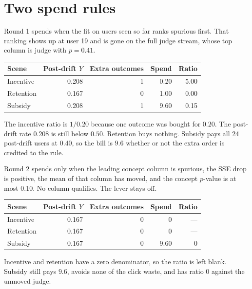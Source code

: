 \documentclass[11pt,a4paper]{article}
\begin{document}
\section{Two spend rules}
Round 1 spends when the fit on users seen so far ranks spurious first. That ranking shows up at user 19 and is gone on the full judge stream, whose top column is judge with \(p=0.41\).

\begin{center}
\begin{tabular}{lrrrr}
\toprule
Scene & Post-drift \(Y\) & Extra outcomes & Spend & Ratio \\
\midrule
Incentive & 0.208 & 1 & 0.20 & 5.00 \\
Retention & 0.167 & 0 & 1.00 & 0.00 \\
Subsidy & 0.208 & 1 & 9.60 & 0.15 \\
\bottomrule
\end{tabular}
\end{center}

The incentive ratio is \(1/0.20\) because one outcome was bought for \(0.20\). The post-drift rate \(0.208\) is still below \(0.50\). Retention buys nothing. Subsidy pays all 24 post-drift users at \(0.40\), so the bill is \(9.6\) whether or not the extra order is credited to the rule.

Round 2 spends only when the leading concept column is spurious, the SSE drop is positive, the mean of that column has moved, and the concept \(p\)-value is at most \(0.10\). No column qualifies. The lever stays off.

\begin{center}
\begin{tabular}{lrrrr}
\toprule
Scene & Post-drift \(Y\) & Extra outcomes & Spend & Ratio \\
\midrule
Incentive & 0.167 & 0 & 0 & --- \\
Retention & 0.167 & 0 & 0 & --- \\
Subsidy & 0.167 & 0 & 9.60 & 0 \\
\bottomrule
\end{tabular}
\end{center}

Incentive and retention have a zero denominator, so the ratio is left blank. Subsidy still pays \(9.6\), avoids none of the click waste, and has ratio \(0\) against the unmoved judge.
\end{document}
